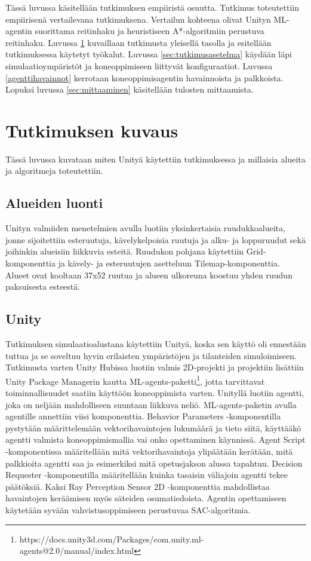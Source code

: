 \documentclass[utf8]{gradu3}
\begin{document}
Tässä luvussa käsitellään tutkimuksen empiiristä osuutta. Tutkimus toteutettiin empiirisenä vertailevana tutkimuksena. Vertailun kohteena olivat Unityn ML-agentin suorittama reitinhaku ja heuristiseen A*-algoritmiin perustuva reitinhaku. Luvussa \ref{sec:tutkimuksenkuvaus} kuvaillaan tutkimusta yleisellä tasolla ja esitellään tutkimuksessa käytetyt työkalut. Luvussa \ref{sec:tutkimusasetelma} käydään läpi simulaatioympäristöt ja koneoppimiseen liittyvät konfiguraatiot. Luvussa \ref{agenttihavainnot} kerrotaan koneoppimisagentin havainnoista ja palkkoista. Lopuksi luvussa \ref{sec:mittaaminen} käsitellään tulosten mittaamista.

\section{Tutkimuksen kuvaus}
\label{sec:tutkimuksenkuvaus}

Tässä luvussa kuvataan miten Unityä käytettiin tutkimuksessa ja millaisia alueita ja algoritmeja toteutettiin.

\subsection{Alueiden luonti}

Unityn valmiiden menetelmien avulla luotiin yksinkertaisia ruudukkoalueita, jonne sijoitettiin esteruutuja, kävelykelpoisia ruutuja ja alku- ja loppuruudut sekä joihinkin alueisiin liikkuvia esteitä. Ruudukon pohjana käytettiin Grid-komponenttia ja kävely- ja esteruutujen asetteluun Tilemap-komponenttia. Alueet ovat kooltaan 37x52 ruutua ja alueen ulkoreuna koostuu yhden ruudun paksuisesta esteestä.

\subsection{Unity}

Tutkimuksen simulaatioalustana käytettiin Unityä, koska sen käyttö oli ennestään tuttua ja se soveltuu hyvin erilaisten ympäristöjen ja tilanteiden simuloimiseen. Tutkimusta varten Unity Hubissa luotiin valmis 2D-projekti ja projektiin lisättiin Unity Package Managerin kautta ML-agents-paketti\footnote{https://docs.unity3d.com/Packages/com.unity.ml-agents@2.0/manual/index.html}, jotta tarvittavat toiminnallisuudet saatiin käyttöön koneoppimista varten. Unityllä luotiin agentti, joka on neljään mahdolliseen suuntaan liikkuva neliö. ML-agents-paketin avulla agentille annettiin viisi komponenttia. Behavior Parameters -komponentilla pystytään määrittelemään vektorihavaintojen lukumäärä ja tieto siitä, käyttääkö agentti valmista koneoppimismallia vai onko opettaminen käynnissä. Agent Script -komponentissa määritellään mitä vektorihavaintoja ylipäätään kerätään, mitä palkkioita agentti saa ja esimerkiksi mitä opetusjakson alussa tapahtuu. Decision Requester -komponentilla määritellään kuinka tasaisin väliajoin agentti tekee päätöksiä. Kaksi Ray Perception Sensor 2D -komponenttia mahdollistaa havaintojen keräämisen myös säteiden osumatiedoista. Agentin opettamiseen käytetään syvään vahvistusoppimiseen perustuvaa SAC-algoritmia.
\end{document}
